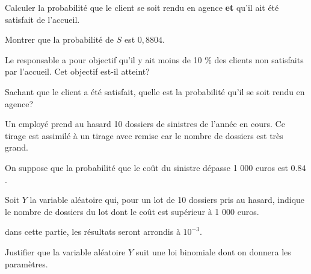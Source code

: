 \documentclass[a4paper,12pt]{scrartcl}
\begin{document}
\question{}
Calculer la probabilité que le client se soit rendu en agence \textbf{et} qu'il ait été satisfait de l'accueil.


\question{}
Montrer que la probabilité de $S$ est $0,8804$. 


\question{}
Le responsable a pour objectif qu'il y ait moins de 10 \% des clients non satisfaits par l'accueil. Cet objectif est-il atteint?


\question{}
Sachant que le client a été satisfait, quelle est la probabilité qu'il se soit rendu en agence?


Un employé prend au hasard 10 dossiers de sinistres de l'année en cours. Ce tirage est assimilé à un tirage avec remise car le nombre de dossiers est très grand.

On suppose que la probabilité que le coût du sinistre dépasse 1 000 euros est $0.84$.

Soit $Y$ la variable aléatoire qui, pour un lot de 10 dossiers pris au hasard, indique le nombre de dossiers du lot dont le coût est supérieur à 1 000 euros.

dans cette partie, les résultats seront arrondis à $10^{-3}$.

\question{}
Justifier que la variable aléatoire $Y$ suit une loi binomiale dont on donnera les paramètres.

\end{document}

